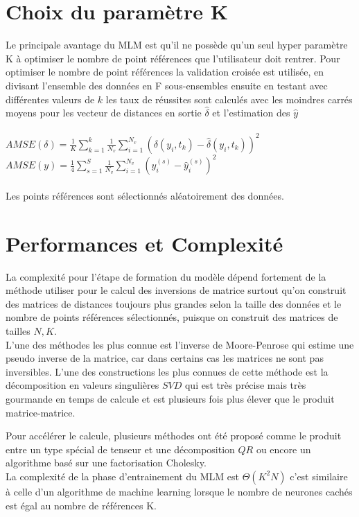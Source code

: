 \documentclass[12pt,a4paper]{report}
\begin{document}
{\color{MidnightBlue}\section{Choix du paramètre K}}
\par Le principale avantage du MLM est qu'il ne possède qu'un seul hyper paramètre K à optimiser le nombre de point références que l'utilisateur doit rentrer. Pour optimiser le nombre de point références la validation croisée est utilisée, en divisant l'ensemble des données en F sous-ensembles ensuite en testant avec différentes valeurs de $k$ les taux de réussites sont calculés avec les moindres carrés moyens pour les vecteur de distances en sortie $\hat{\delta}$ et l'estimation des $\hat{y}$\\ \\
$AMSE(\delta) = \frac{1}{K} \sum_{k=1}^k \frac{1}{N_v} \sum_{i=1}^{N_v} (\delta(y_i,t_k) - \hat{\delta}(y_i,t_k))^2$ \\
$AMSE(y)=\frac{1}{4} \sum_{s = 1}^S \frac{1}{N_v} \sum_{i = 1}^{N_v} (y_i^{(s)} -\hat{y}_i^{(s)})^2$\\\\
Les points références sont sélectionnés aléatoirement des données. 

{\color{MidnightBlue}\section{Performances et Complexité}}
\par La complexité pour l'étape de formation du modèle  dépend fortement de la méthode utiliser pour le calcul des inversions de matrice surtout qu'on construit des matrices de distances toujours plus grandes selon la taille des données et le nombre de points références sélectionnés, puisque on construit des matrices de tailles $N,K$.\\
L'une des méthodes les plus connue est l'inverse de Moore-Penrose qui estime une pseudo inverse de la matrice, car dans certains cas les matrices ne sont pas inversibles. L'une des constructions les plus connues de cette méthode est la décomposition en valeurs singulières $SVD$ qui est très précise mais très gourmande en temps de calcule et est plusieurs fois plus élever que le produit matrice-matrice.\\
\par Pour accélérer le calcule, plusieurs méthodes ont été proposé comme le produit entre un type spécial de tenseur et une décomposition $QR$ ou encore un algorithme basé sur une factorisation Cholesky.\\
La complexité de la phase d'entrainement du MLM est $\Theta (K^2N)$ c'est similaire à celle d'un algorithme de machine learning lorsque le nombre de neurones cachés est égal au nombre de références K.
\end{document}
